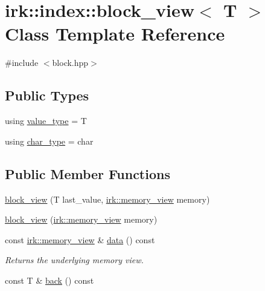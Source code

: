 \hypertarget{classirk_1_1index_1_1block__view}{}\section{irk\+:\+:index\+:\+:block\+\_\+view$<$ T $>$ Class Template Reference}
\label{classirk_1_1index_1_1block__view}


{\ttfamily \#include $<$block.\+hpp$>$}

\subsection*{Public Types}
\begin{DoxyCompactItemize}
\item 
using \mbox{\hyperlink{classirk_1_1index_1_1block__view_ad79674ad64c94861b74dd15e603c0f8b}{value\+\_\+type}} = T
\item 
using \mbox{\hyperlink{classirk_1_1index_1_1block__view_af24362772032fb0ab7364162e0611483}{char\+\_\+type}} = char
\end{DoxyCompactItemize}
\subsection*{Public Member Functions}
\begin{DoxyCompactItemize}
\item 
\mbox{\hyperlink{classirk_1_1index_1_1block__view_ac42c1a26fd05c0f53f91cc51cc090e75}{block\+\_\+view}} (T last\+\_\+value, \mbox{\hyperlink{classirk_1_1memory__view}{irk\+::memory\+\_\+view}} memory)
\item 
\mbox{\hyperlink{classirk_1_1index_1_1block__view_aebe22ab369a7a62a205f2b3e4196cc3d}{block\+\_\+view}} (\mbox{\hyperlink{classirk_1_1memory__view}{irk\+::memory\+\_\+view}} memory)
\item 
const \mbox{\hyperlink{classirk_1_1memory__view}{irk\+::memory\+\_\+view}} \& \mbox{\hyperlink{classirk_1_1index_1_1block__view_a90c3c66aad54b62b4378b4a653fb4260}{data}} () const
\begin{DoxyCompactList}\small\item\em Returns the underlying memory view. \end{DoxyCompactList}\item 
const T \& \mbox{\hyperlink{classirk_1_1index_1_1block__view_a3ecf4e4f284b21ce77a8dda80ac37161}{back}} () const
\end{DoxyCompactItemize}


